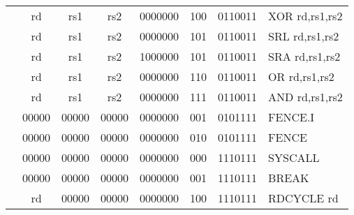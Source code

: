 \begin{table}[p]
\begin{small}
\begin{center}
\begin{tabular}{rccccccccccl}
&
\multicolumn{1}{|c|}{rd} &
\multicolumn{1}{c|}{rs1} &
\multicolumn{1}{c|}{rs2} &
\multicolumn{4}{c|}{0000000} &
\multicolumn{2}{c|}{100} &
\multicolumn{1}{c|}{0110011} & XOR rd,rs1,rs2 \\
\cline{2-11}
  

&
\multicolumn{1}{|c|}{rd} &
\multicolumn{1}{c|}{rs1} &
\multicolumn{1}{c|}{rs2} &
\multicolumn{4}{c|}{0000000} &
\multicolumn{2}{c|}{101} &
\multicolumn{1}{c|}{0110011} & SRL rd,rs1,rs2 \\
\cline{2-11}
  

&
\multicolumn{1}{|c|}{rd} &
\multicolumn{1}{c|}{rs1} &
\multicolumn{1}{c|}{rs2} &
\multicolumn{4}{c|}{1000000} &
\multicolumn{2}{c|}{101} &
\multicolumn{1}{c|}{0110011} & SRA rd,rs1,rs2 \\
\cline{2-11}
  

&
\multicolumn{1}{|c|}{rd} &
\multicolumn{1}{c|}{rs1} &
\multicolumn{1}{c|}{rs2} &
\multicolumn{4}{c|}{0000000} &
\multicolumn{2}{c|}{110} &
\multicolumn{1}{c|}{0110011} & OR rd,rs1,rs2 \\
\cline{2-11}
  

&
\multicolumn{1}{|c|}{rd} &
\multicolumn{1}{c|}{rs1} &
\multicolumn{1}{c|}{rs2} &
\multicolumn{4}{c|}{0000000} &
\multicolumn{2}{c|}{111} &
\multicolumn{1}{c|}{0110011} & AND rd,rs1,rs2 \\
\cline{2-11}
  

&
\multicolumn{1}{|c|}{00000} &
\multicolumn{1}{c|}{00000} &
\multicolumn{1}{c|}{00000} &
\multicolumn{4}{c|}{0000000} &
\multicolumn{2}{c|}{001} &
\multicolumn{1}{c|}{0101111} & FENCE.I  \\
\cline{2-11}
  

&
\multicolumn{1}{|c|}{00000} &
\multicolumn{1}{c|}{00000} &
\multicolumn{1}{c|}{00000} &
\multicolumn{4}{c|}{0000000} &
\multicolumn{2}{c|}{010} &
\multicolumn{1}{c|}{0101111} & FENCE  \\
\cline{2-11}
  

&
\multicolumn{1}{|c|}{00000} &
\multicolumn{1}{c|}{00000} &
\multicolumn{1}{c|}{00000} &
\multicolumn{4}{c|}{0000000} &
\multicolumn{2}{c|}{000} &
\multicolumn{1}{c|}{1110111} & SYSCALL  \\
\cline{2-11}
  

&
\multicolumn{1}{|c|}{00000} &
\multicolumn{1}{c|}{00000} &
\multicolumn{1}{c|}{00000} &
\multicolumn{4}{c|}{0000000} &
\multicolumn{2}{c|}{001} &
\multicolumn{1}{c|}{1110111} & BREAK  \\
\cline{2-11}
  

&
\multicolumn{1}{|c|}{rd} &
\multicolumn{1}{c|}{00000} &
\multicolumn{1}{c|}{00000} &
\multicolumn{4}{c|}{0000000} &
\multicolumn{2}{c|}{100} &
\multicolumn{1}{c|}{1110111} & RDCYCLE rd \\
\cline{2-11}
  


\end{tabular}
\end{center}
\end{small}
\end{table}
